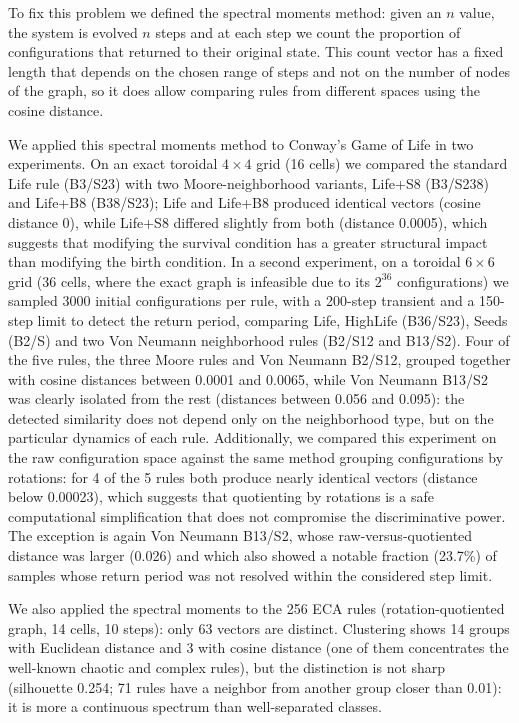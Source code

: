 \documentclass[a4paper,11pt]{article}
\begin{document}
To fix this problem we defined the spectral moments method: given an $n$ value, the system is evolved $n$ steps and at each step we count the proportion of configurations that returned to their original state. This count vector has a fixed length that depends on the chosen range of steps and not on the number of nodes of the graph, so it does allow comparing rules from different spaces using the cosine distance.

We applied this spectral moments method to Conway's Game of Life in two experiments. On an exact toroidal $4\times4$ grid (16 cells) we compared the standard Life rule (B3/S23) with two Moore-neighborhood variants, Life+S8 (B3/S238) and Life+B8 (B38/S23); Life and Life+B8 produced identical vectors (cosine distance 0), while Life+S8 differed slightly from both (distance 0.0005), which suggests that modifying the survival condition has a greater structural impact than modifying the birth condition. In a second experiment, on a toroidal $6\times6$ grid (36 cells, where the exact graph is infeasible due to its $2^{36}$ configurations) we sampled 3000 initial configurations per rule, with a 200-step transient and a 150-step limit to detect the return period, comparing Life, HighLife (B36/S23), Seeds (B2/S) and two Von Neumann neighborhood rules (B2/S12 and B13/S2). Four of the five rules, the three Moore rules and Von Neumann B2/S12, grouped together with cosine distances between 0.0001 and 0.0065, while Von Neumann B13/S2 was clearly isolated from the rest (distances between 0.056 and 0.095): the detected similarity does not depend only on the neighborhood type, but on the particular dynamics of each rule. Additionally, we compared this experiment on the raw configuration space against the same method grouping configurations by rotations: for 4 of the 5 rules both produce nearly identical vectors (distance below 0.00023), which suggests that quotienting by rotations is a safe computational simplification that does not compromise the discriminative power. The exception is again Von Neumann B13/S2, whose raw-versus-quotiented distance was larger (0.026) and which also showed a notable fraction (23.7\%) of samples whose return period was not resolved within the considered step limit.

We also applied the spectral moments to the 256 ECA rules (rotation-quotiented graph, 14 cells, 10 steps): only 63 vectors are distinct. Clustering shows 14 groups with Euclidean distance and 3 with cosine distance (one of them concentrates the well-known chaotic and complex rules), but the distinction is not sharp (silhouette 0.254; 71 rules have a neighbor from another group closer than 0.01): it is more a continuous spectrum than well-separated classes.
\end{document}
